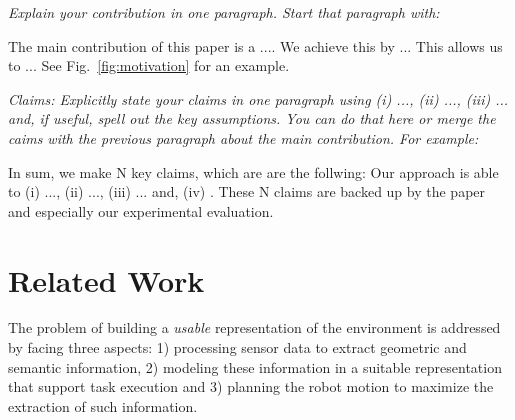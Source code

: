 \documentclass[letterpaper, 10 pt, conference]{ieeeconf}  %
\def\figref#1{Fig.~\ref{#1}}
\begin{document}
\emph{Explain your contribution in one paragraph. Start that paragraph with:}

The main contribution of this paper is a ....  We achieve this by
... This allows us to ... See \figref{fig:motivation} for an example.

\emph{Claims: Explicitly state your claims in one paragraph using (i)
  ..., (ii) ..., (iii) ... and, if useful, spell out the key
  assumptions. You can do that here or merge the caims with the
  previous paragraph about the main contribution. For example:}

In sum, we make N key claims, which are are the follwing:
Our approach is able to
%
(i) ..., 
%
(ii) ..., 
%
(iii) ... and,
%
(iv) . 
% 
These N claims are backed up by the paper and especially 
our experimental evaluation.


\section{Related Work}
\label{sec:related}

%
%
%
%
%
%

The problem of building a \emph{usable} representation of the environment is addressed by facing three aspects: 1) processing sensor data to extract geometric and semantic information, 2) modeling these information in a suitable representation that support task execution and 3) planning the robot motion to maximize the extraction of such information.
\end{document}
